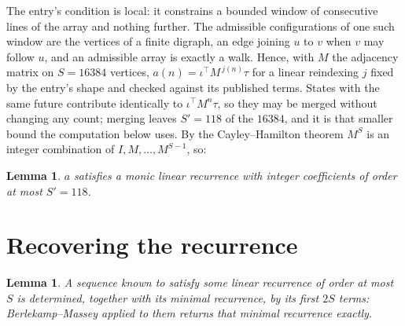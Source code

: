 \documentclass[11pt,a4paper]{article}
\theoremstyle{plain}
\newtheorem{lemma}[theorem]{Lemma}
\theoremstyle{definition}
\begin{document}
The entry's condition is local: it constrains a bounded window of consecutive lines of the
array and nothing further. The admissible configurations of one such window are the vertices
of a finite digraph, an edge joining $u$ to $v$ when $v$ may follow $u$, and an admissible
array is exactly a walk. Hence, with $M$ the adjacency matrix on $S=16384$ vertices,
$a(n)=\iota^{\!\top}M^{\,j(n)}\tau$ for a linear reindexing $j$ fixed by the entry's shape
and checked against its published terms. States with the same future contribute identically to $\iota^{\!\top}M^n\tau$, so they may be merged without changing any count; merging leaves $S'=118$ of the $16384$, and it is that smaller bound the computation below uses. By the Cayley--Hamilton theorem $M^{S}$ is an
integer combination of $I,M,\dots,M^{S-1}$, so:

\begin{lemma}\label{lem:cf}
$a$ satisfies a monic linear recurrence with integer coefficients of order at most
$S'=118$.
\end{lemma}

\section{Recovering the recurrence}

\begin{lemma}\label{lem:bm}
A sequence known to satisfy some linear recurrence of order at most $S$ is determined, together
with its minimal recurrence, by its first $2S$ terms: Berlekamp--Massey applied to them returns
that minimal recurrence exactly.
\end{lemma}
\end{document}
